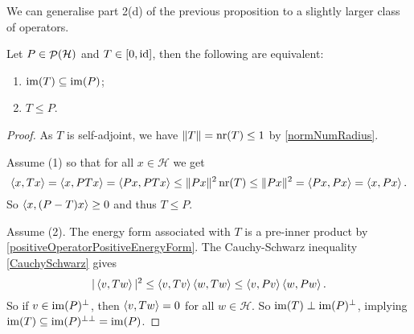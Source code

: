 We can generalise part 2(d) of the previous proposition to a slightly larger class of operators.
\begin{lemma} \label{comparisonSelfAdjointProjection}
Let $P\in \mathop{\mathcal{P}}\nolimits(\mathcal{H})$ and $T \in [0,\operatorname{id}]$, then the following are equivalent:
\begin{enumerate}
\item $\operatorname{im}(T) \subseteq \operatorname{im}(P)$;
\item $T\leq P$.
\end{enumerate}
\end{lemma}
\begin{proof}
As $T$ is self-adjoint, we have $\lVert T\rVert = \operatorname{nr}(T) \leq 1$ by \ref{normNumRadius}.

Assume (1) so that for all $x\in \mathcal{H}$ we get
\[ \left\langle x,Tx \right\rangle = \left\langle x, PTx \right\rangle = \left\langle Px,PTx \right\rangle \leq \lVert Px\rVert^2\operatorname{nr}(T) \leq \lVert Px\rVert^2 = \left\langle Px,Px \right\rangle = \left\langle x,Px \right\rangle. \]
So $\left\langle x, (P-T)x \right\rangle\geq 0$ and thus $T\leq P$.

Assume (2). The energy form associated with $T$ is a pre-inner product by \ref{positiveOperatorPositiveEnergyForm}. The Cauchy-Schwarz inequality \ref{CauchySchwarz} gives
\[ |\left\langle v,Tw \right\rangle|^2 \leq \left\langle v,Tv \right\rangle\left\langle w,Tw \right\rangle \leq \left\langle v,Pv \right\rangle\left\langle w,Pw \right\rangle. \]
So if $v\in\operatorname{im}(P)^\perp$, then $\left\langle v,Tw \right\rangle = 0$ for all $w\in \mathcal{H}$. So $\operatorname{im}(T)\perp \operatorname{im}(P)^\perp$, implying $\operatorname{im}(T)\subseteq \operatorname{im}(P)^{\perp\perp} = \operatorname{im}(P)$.
\end{proof}

